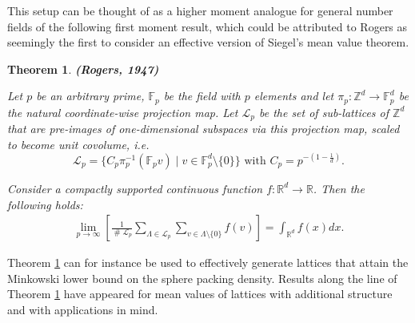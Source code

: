 \documentclass{amsart}
\newtheorem{theorem}{Theorem}
\DeclareMathOperator{\card}{\texttt{\#}}
\begin{document}
This setup can be thought of as a higher moment analogue for general number fields of the following first moment result, which could be attributed to Rogers \cite{Rog47} as seemingly the first to consider an effective version of Siegel's mean value theorem.
\begin{theorem}
{\bf (Rogers, 1947) }
\label{th:rogers}

Let $p$ be an arbitrary prime, $\mathbb{F}_p$ be the field with $p$ elements and let $\pi_p:\mathbb{Z}^{d} \rightarrow \mathbb{F}_p^{d}$ be the natural coordinate-wise projection map.  Let $\mathcal{L}_p$ be the set of sub-lattices of $\mathbb{Z}^{d}$ that are pre-images of one-dimensional subspaces via this projection map, scaled to become unit covolume, i.e. $$\mathcal{L}_p = \{ C_p \pi_p^{-1}( \mathbb{F}_p v) \mid v \in \mathbb{F}_p^d \setminus \{ 0\} \}\text{ with } C_p = p^{-\left(1-\frac{1}{d}\right)} .$$

Consider a compactly supported continuous function $f:\mathbb{R}^{d} \rightarrow \mathbb{R}$. Then the following holds:
\begin{align}
\lim_{ p \rightarrow \infty}\left[ \frac{1}{\card {\mathcal{L}}_p}\sum_{ \Lambda \in {\mathcal{L}}_p} \sum_{v\in\Lambda\setminus\{0\}} f(v) \right] = \int_{\mathbb{R}^{d}} f(x) dx.
\end{align}
\end{theorem}

Theorem \ref{th:rogers} can for instance be used to effectively generate lattices that attain the Minkowski lower bound on the sphere packing density. Results along the line of Theorem \ref{th:rogers} have appeared \cite{M16,GS21} for mean values of lattices with additional structure and with applications in mind. 
\end{document}
